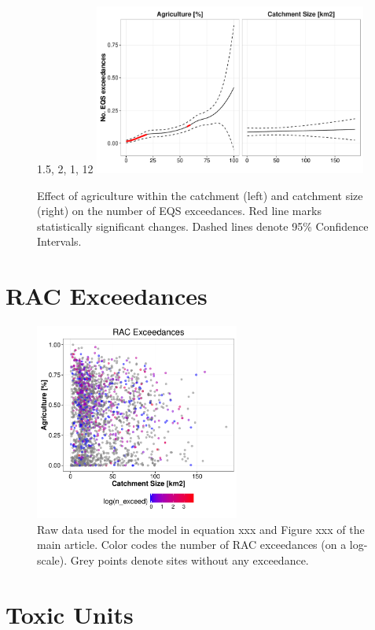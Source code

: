 \documentclass[pdftex,a4paper]{scrreprt}
\begin{document}
\begin{figure}1.5, 2, 1, 12
  \includegraphics[width=0.8\textwidth]{ezgagrieqsmodel}
  \caption{Effect of agriculture within the catchment (left) and catchment size (right) on the number of EQS exceedances. Red line marks statistically significant changes. Dashed lines denote 95\% Confidence Intervals.
  }
  \label{fig:ezgeqsagrimodel}
\end{figure}


\section{RAC Exceedances}
\begin{figure}[h]
	\centering
	\includegraphics[width = 0.6\textwidth]{ezgagrirac}
	\caption{Raw data used for the model in equation xxx and Figure xxx of the main article. Color codes the number of RAC exceedances (on a log-scale). Grey points denote sites without any exceedance.}
	\label{fig:ezgagrirac}
\end{figure}


\pagebreak
\section{Toxic Units}
\end{document}
